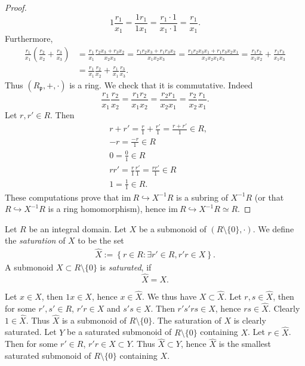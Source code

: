 \begin{proof}
    $$1 \frac{r_1}{x_1} = \frac{1r_1}{1x_1} = \frac{r_1\cdot 1}{x_1\cdot 1} = \frac{r_1}{x_1}.$$
    Furthermore,
    \begin{align*}
        \frac{r_1}{x_1}\left(\frac{r_2}{x_2}+\frac{r_3}{x_3}\right) &= \frac{r_1}{x_1}\frac{r_2x_3+r_3x_2}{x_2x_3} = \frac{r_1r_2x_3+r_1r_3x_2}{x_1x_2x_3} = \frac{r_1r_2x_3x_1+r_1r_3x_2x_1}{x_1x_2x_1x_3} = \frac{r_1r_2}{x_1x_2} + \frac{r_1r_3}{x_1x_3}\\
        &= \frac{r_1}{x_1}\frac{r_2}{x_2}+\frac{r_1}{x_1}\frac{r_3}{x_3}.
    \end{align*}
    Thus $(R_\mathfrak{p},+,\cdot)$ is a ring. We check that it is commutative. Indeed
    $$\frac{r_1}{x_1}\frac{r_2}{x_2} = \frac{r_1r_2}{x_1x_2}= \frac{r_2r_1}{x_2x_1}=\frac{r_2}{x_2}\frac{r_1}{x_1}.$$
    Let $r,r'\in R$. Then 
    \begin{align*} 
        &r + r' = \frac{r}{1}+ \frac{r'}{1} = \frac{r+r'}{1}\in R,\\
        &-r = \frac{-r}{1}\in R\\
        &0 = \frac{0}{1}\in R\\
        &rr' = \frac{r}{1}\frac{r'}{1}= \frac{rr'}{1}\in R\\
        & 1 = \frac{1}{1}\in R.
    \end{align*}
    These computations prove that $\text{im}\ R\hookrightarrow X^{-1}R$ is a subring of $X^{-1}R$ (or that $R\hookrightarrow X^{-1}R$ is a ring homomorphism), hence $\text{im}\ R\hookrightarrow X^{-1}R\simeq R$.
\end{proof}
\begin{definition}
    Let $R$ be an integral domain. Let $X$ be a submonoid of $(R\setminus \{0\}, \cdot)$. We define the \textit{saturation} of $X$ to be the set
    \begin{align*}
        \widehat{X} := \left\{ r\in R : \exists r'\in R, r'r \in X \right\}.
    \end{align*}
    A submonoid $X \subset R\setminus \{0\}$ is \textit{saturated}, if 
    $$\widehat{X} = X.$$
\end{definition}
\begin{remark}
    Let $x\in X$, then $1x\in X$, hence $x\in \widehat{X}$. We thus have $X\subset \widehat{X}$. Let $r,s\in \widehat{X}$, then for some $r',s'\in R$, $r'r\in X$ and $s's\in X$. Then $r's'rs\in X$, hence $rs \in \widehat{X}$. Clearly $1\in \widehat{X}$. Thus $\widehat{X}$ is a submonoid of $R\setminus\{0\}$. The saturation of $X$ is clearly saturated. Let $Y$ be a saturated submonoid of $R\setminus \{0\}$ containing $X$. Let $r \in \widehat{X}$. Then for some $r'\in R$, $r'r\in X\subset Y$. Thus $\widehat{X}\subset Y$, hence $\widehat{X}$ is the smallest saturated submonoid of $R\setminus\{0\}$ containing $X$.
\end{remark}

